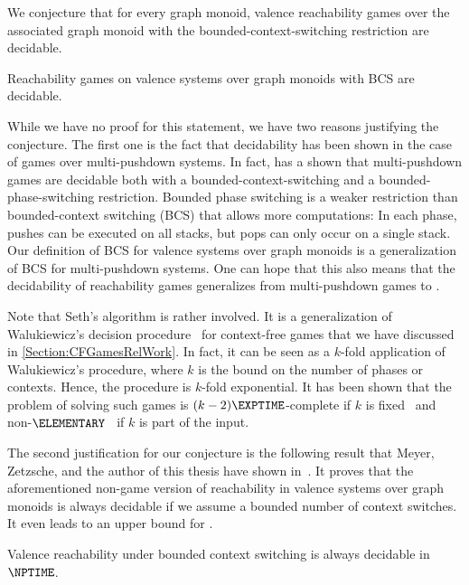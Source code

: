 \documentclass[../../diss.tex]{subfiles}
\begin{document}
We conjecture that for every graph monoid, valence reachability games over the associated graph monoid with the bounded-context-switching restriction are decidable.

\begin{conjecture}
    Reachability games on valence systems over graph monoids with BCS are decidable.
\end{conjecture}

While we have no proof for this statement, we have two reasons justifying the conjecture.
The first one is the fact that decidability has been shown in the case of games over multi-pushdown systems.
In fact,  has a shown that multi-pushdown games are decidable both with a bounded-context-switching and a bounded-phase-switching restriction.
Bounded phase switching is a weaker restriction than bounded-context switching (BCS) that allows more computations: In each phase, pushes can be executed on all stacks, but pops can only occur on a single stack.
Our definition of BCS for valence systems over graph monoids is a generalization of BCS for multi-pushdown systems.
One can hope that this also means that the decidability of reachability games generalizes from multi-pushdown games to .

Note that Seth's algorithm is rather involved.
It is a generalization of Walukiewicz's decision procedure~\cite{Walukiewicz01} for context-free games that we have discussed in \cref{Section:CFGamesRelWork}.
In fact, it can be seen as a $k$-fold application of Walukiewicz's procedure, where $k$ is the bound on the number of phases or contexts.
Hence, the procedure is $k$-fold exponential.
It has been shown that the problem of solving such games is $(k-2)\EXPTIME$-complete if $k$ is fixed~\cite{MeyerV20} and non-$\ELEMENTARY$~\cite{AtigBKS12,AtigBKS17} if $k$ is part of the input.

The second justification for our conjecture is the following result that Meyer, Zetzsche, and the author of this thesis have shown in~\cite{MeyerMZ18}.
It proves that the aforementioned non-game version of reachability in valence systems over graph monoids is always decidable if we assume a bounded number of context switches.
It even leads to an upper bound for .

\begin{theorem}%
\label{Theorem:ValenceReachabilityBCS}%
    Valence reachability under bounded context switching is always decidable in $\NPTIME$.
\end{theorem}
\end{document}
